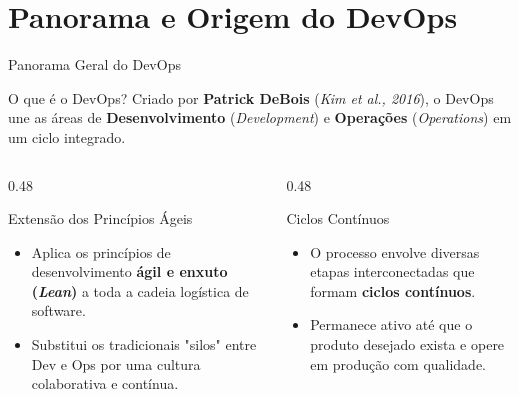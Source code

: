 \documentclass[aspectratio=169, 9pt]{beamer}
\begin{document}
\section{Panorama e Origem do DevOps}

\begin{frame}{Panorama Geral do DevOps}
  \begin{block}{O que é o DevOps?}
    Criado por \textbf{Patrick DeBois} (\textit{Kim et al., 2016}), o DevOps une as áreas de \textbf{Desenvolvimento} (\textit{Development}) e \textbf{Operações} (\textit{Operations}) em um ciclo integrado.
  \end{block}

  \vspace{0.2cm}

  \begin{columns}[T]
    \begin{column}{0.48\textwidth}
      \begin{exampleblock}{Extensão dos Princípios Ágeis}
        \begin{itemize}
          \item Aplica os princípios de desenvolvimento \textbf{ágil e enxuto (\textit{Lean})} a toda a cadeia logística de software.
          \item Substitui os tradicionais "silos" entre Dev e Ops por uma cultura colaborativa e contínua.
        \end{itemize}
      \end{exampleblock}
    \end{column}

    \begin{column}{0.48\textwidth}
      \begin{alertblock}{Ciclos Contínuos}
        \begin{itemize}
          \item O processo envolve diversas etapas interconectadas que formam \textbf{ciclos contínuos}.
          \item Permanece ativo até que o produto desejado exista e opere em produção com qualidade.
        \end{itemize}
      \end{alertblock}
    \end{column}
  \end{columns}
\end{frame}
\end{document}
